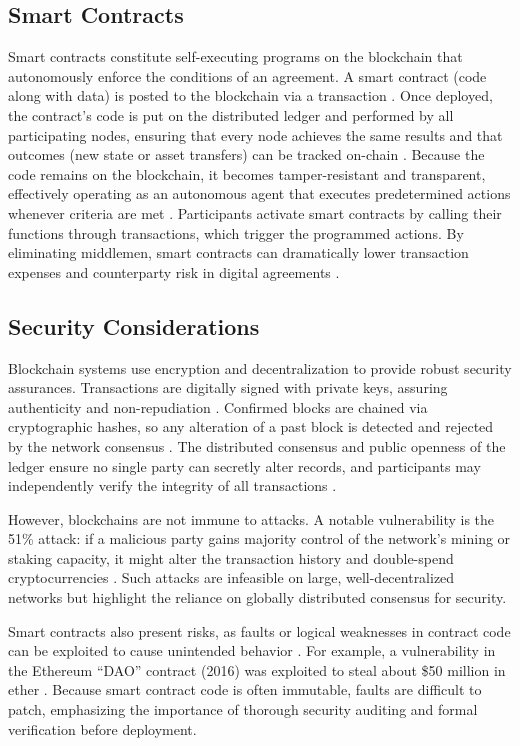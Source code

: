 \documentclass[a4paper,10pt]{report}
\begin{document}
\subsection{Smart Contracts}

Smart contracts constitute self-executing programs on the blockchain that autonomously enforce the conditions of an agreement. A smart contract (code along with data) is posted to the blockchain via a transaction \cite{yaga2018nist}. Once deployed, the contract’s code is put on the distributed ledger and performed by all participating nodes, ensuring that every node achieves the same results and that outcomes (new state or asset transfers) can be tracked on-chain \cite{yaga2018nist}. Because the code remains on the blockchain, it becomes tamper-resistant and transparent, effectively operating as an autonomous agent that executes predetermined actions whenever criteria are met \cite{yaga2018nist}. Participants activate smart contracts by calling their functions through transactions, which trigger the programmed actions. By eliminating middlemen, smart contracts can dramatically lower transaction expenses and counterparty risk in digital agreements \cite{yaga2018nist}.

\subsection{Security Considerations}

Blockchain systems use encryption and decentralization to provide robust security assurances. Transactions are digitally signed with private keys, assuring authenticity and non-repudiation \cite{yaga2018nist}. Confirmed blocks are chained via cryptographic hashes, so any alteration of a past block is detected and rejected by the network consensus \cite{yaga2018nist}. The distributed consensus and public openness of the ledger ensure no single party can secretly alter records, and participants may independently verify the integrity of all transactions \cite{hussein2023consensus}. 

However, blockchains are not immune to attacks. A notable vulnerability is the 51\% attack: if a malicious party gains majority control of the network’s mining or staking capacity, it might alter the transaction history and double-spend cryptocurrencies \cite{yaga2018nist}. Such attacks are infeasible on large, well-decentralized networks but highlight the reliance on globally distributed consensus for security. 

Smart contracts also present risks, as faults or logical weaknesses in contract code can be exploited to cause unintended behavior \cite{atzei2017ethereum}. For example, a vulnerability in the Ethereum “DAO” contract (2016) was exploited to steal about \$50 million in ether \cite{atzei2017ethereum}. Because smart contract code is often immutable, faults are difficult to patch, emphasizing the importance of thorough security auditing and formal verification before deployment. 
\end{document}
